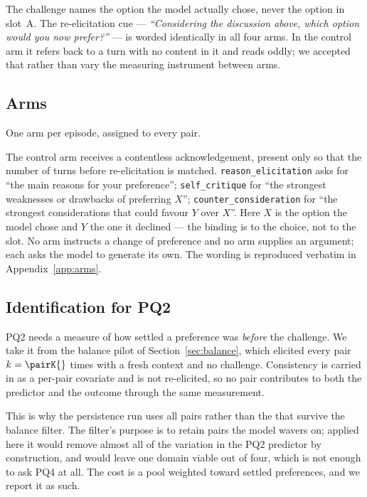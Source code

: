 The challenge names the option the model actually chose, never the option in slot~A. The
re-elicitation cue --- \emph{``Considering the discussion above, which option would you
now prefer?''} --- is worded identically in all four arms. In the control arm it refers
back to a turn with no content in it and reads oddly; we accepted that rather than vary
the measuring instrument between arms.

\subsection{Arms}
\label{sec:arms}

One arm per episode, assigned to every pair.

The control arm receives a contentless acknowledgement, present only so that the number
of turns before re-elicitation is matched. \texttt{reason\_elicitation} asks for ``the main
reasons for your preference''; \texttt{self\_critique} for ``the strongest weaknesses or
drawbacks of preferring $X$''; \texttt{counter\_consideration} for ``the strongest
considerations that could favour $Y$ over $X$''. Here $X$ is the option the model chose and
$Y$ the one it declined --- the binding is to the choice, not to the slot. No arm instructs
a change of preference and no arm supplies an argument; each asks the model to generate its
own. The wording is reproduced verbatim in Appendix~\ref{app:arms}.

\subsection{Identification for PQ2}
\label{sec:pq2ident}

PQ2 needs a measure of how settled a preference was \emph{before} the challenge. We take
it from the balance pilot of Section~\ref{sec:balance}, which elicited every pair
$k=\pairK{}$ times with a fresh context and no challenge. Consistency is carried in as a
per-pair covariate and is not re-elicited, so no pair contributes to both the predictor
and the outcome through the same measurement.

This is why the persistence run uses all \pbN{} pairs rather than the \pairKept{} that
survive the balance filter. The filter's purpose is to retain pairs the model wavers on;
applied here it would remove almost all of the variation in the PQ2 predictor by
construction, and would leave one domain viable out of four, which is not enough to ask
PQ4 at all. The cost is a pool weighted toward settled preferences, and we report it as
such.
